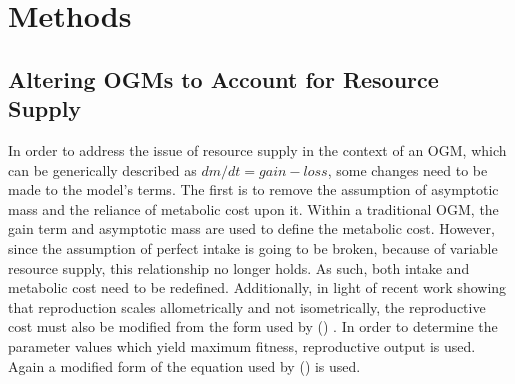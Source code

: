\documentclass[a4paper, 11pt, hidelinks]{article} %
\newcommand{\authorcite}[1]{\citeauthor{#1} (\citeyear{#1})}
\begin{document}
	
\section{Methods}
	
	\subsection{Altering OGMs to Account for Resource Supply}
	In order to address the issue of resource supply in the context of an OGM, which can be generically described as $dm/dt = gain - loss$, some changes need to be made to the model's terms.  The first is to remove the assumption of asymptotic mass and the reliance of metabolic cost upon it.  Within a traditional OGM, the gain term and asymptotic mass are used to define the metabolic cost.  However, since the assumption of perfect intake is going to be broken, because of variable resource supply, this relationship no longer holds.  As such, both intake and metabolic cost need to be redefined.  Additionally, in light of recent work showing that reproduction scales allometrically and not isometrically, the reproductive cost must also be modified from the form used by \citeauthor{Charnov2001} (\citeyear{Charnov2001}) \parencite{Marshall2019, Barneche2018}.  In order to determine the parameter values which yield maximum fitness, reproductive output is used.  Again a modified form of the equation used by \authorcite{Charnov2001} is used.
	
\end{document}
